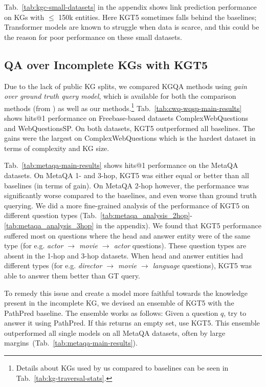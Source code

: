 \documentclass[11pt]{article}
\renewcommand\:{\colon} \newcommand{\sset}[1]{\left\{\,#1\,\right\}} \newcommand{\ssets}[1]{\left\{#1\right\}} \newcommand{\ssetn}[1]{\{\,#1\,\}}
\newcommand{\method}{\textsc{KGT5}}
\begin{document}
Tab.~\ref{tab:kgc-small-datasets} in the appendix shows link prediction performance on KGs with $\leq$ 150k entities. Here \method{} sometimes falls behind the baselines; Transformer models are known to struggle when data is scarce, and this could be the reason for poor performance on these small datasets.






\subsection{QA over Incomplete KGs with \method{}}
\label{sec:experiment_kgqa}
Due to the lack of public KG splits, we compared KGQA methods using  \textit{gain over ground truth query model}, which is available for both the comparison methods (from \citealt{ren2021lego}) as well as our methods.\footnote{Details about KGs used by us compared to baselines can be seen in Tab.~\ref{tab:kg-traversal-stats}.}  
Tab.~\ref{tab:cwq-wqsp-main-results} shows hits@1 performance on Freebase-based datasets ComplexWebQuestions and WebQuestionsSP. On both datasets, KGT5 outperformed all baselines. The gains were the largest on ComplexWebQuestions which is the hardest dataset in terms of complexity and KG size.

Tab.~\ref{tab:metaqa-main-results} shows hits@1 performance on the MetaQA datasets. 
On MetaQA 1- and 3-hop, \method{} was either equal or better than all baselines (in terms of gain). On MetaQA 2-hop however, the performance was significantly worse compared to the baselines, and even worse than ground truth querying. We did a more fine-grained analysis of the performance of \method{} on different question types (Tab.~\ref{tab:metaqa_analysis_2hop}-\ref{tab:metaqa_analysis_3hop} in the appendix). We found that \method{} performance suffered most on questions where the head and answer entity were of the same type (for e.g. \textit{actor $\rightarrow$ movie $\rightarrow$ actor} questions). 
These question types are absent in the 1-hop and 3-hop datasets. 
When head and answer entities had different types (for e.g. \textit{director $\rightarrow$ movie $\rightarrow$ language} questions), \method{} was able to answer them better than GT query.


To remedy this issue and create a model more faithful towards the knowledge present in the incomplete KG, we devised an ensemble of \method{} with the PathPred baseline. The ensemble works as follows: Given a question $q$, try to answer it using PathPred. If this returns an empty set, use \method{}. This ensemble outperformed all single models on all MetaQA datasets, often by large margins~(Tab.~\ref{tab:metaqa-main-results}).
\end{document}
